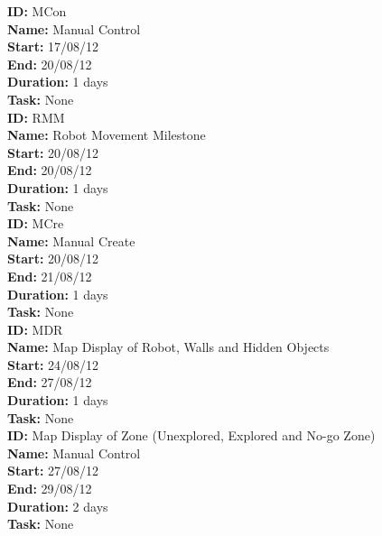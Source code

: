 \documentclass[11pt, a4paper]{report}
\begin{document}
\noindent \textbf{ID:} MCon \\
\noindent \textbf{Name:} Manual Control \\
\noindent \textbf{Start:} 17/08/12 \\
\noindent \textbf{End:} 20/08/12 \\
\noindent \textbf{Duration:} 1 days \\
\noindent \textbf{Task:} None\\[0.5cm]

\noindent \textbf{ID:} RMM \\
\noindent \textbf{Name:} Robot Movement Milestone \\
\noindent \textbf{Start:} 20/08/12 \\
\noindent \textbf{End:} 20/08/12 \\
\noindent \textbf{Duration:} 1 days \\
\noindent \textbf{Task:} None\\[0.5cm]

\noindent \textbf{ID:} MCre \\
\noindent \textbf{Name:} Manual Create \\
\noindent \textbf{Start:} 20/08/12 \\
\noindent \textbf{End:} 21/08/12 \\
\noindent \textbf{Duration:} 1 days \\
\noindent \textbf{Task:} None\\[0.5cm]

\noindent \textbf{ID:} MDR \\
\noindent \textbf{Name:} Map Display of Robot, Walls and Hidden Objects \\
\noindent \textbf{Start:} 24/08/12 \\
\noindent \textbf{End:} 27/08/12 \\
\noindent \textbf{Duration:} 1 days \\
\noindent \textbf{Task:} None\\[0.5cm]

\noindent \textbf{ID:} Map Display of Zone (Unexplored, Explored and No-go Zone) \\
\noindent \textbf{Name:} Manual Control \\
\noindent \textbf{Start:} 27/08/12 \\
\noindent \textbf{End:} 29/08/12 \\
\noindent \textbf{Duration:} 2 days \\
\noindent \textbf{Task:} None\\[0.5cm]
\end{document}
